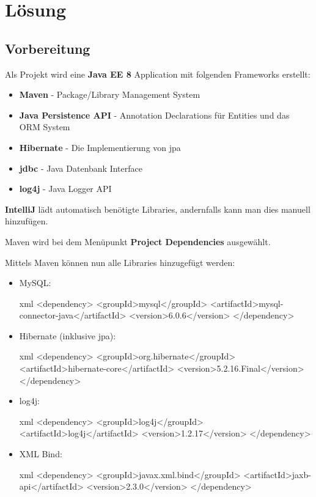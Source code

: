 
\section{Lösung}

\subsection{Vorbereitung}

Als Projekt wird eine \textbf{Java EE 8} Application mit folgenden Frameworks erstellt:
\begin{itemize}
    \item \textbf{Maven} - Package/Library Management System
    \item \textbf{Java Persistence API} - Annotation Declarations für Entities und das ORM System
    \item \textbf{Hibernate} - Die Implementierung von \gls{jpa}
    \item \textbf{\gls{jdbc}} - Java Datenbank Interface
    \item \textbf{log4j} - Java Logger API
\end{itemize}
\textbf{IntelliJ} lädt automatisch benötigte Libraries, andernfalls kann man dies manuell hinzufügen.

Maven wird bei dem Menüpunkt \textbf{Project Dependencies} ausgewählt.

Mittels Maven können nun alle Libraries hinzugefügt werden:

\begin{itemize}
    \item MySQL:
        \begin{code}{xml}
        <dependency>
            <groupId>mysql</groupId>
            <artifactId>mysql-connector-java</artifactId>
            <version>6.0.6</version>
        </dependency>
        \end{code}
    \item Hibernate (inklusive \gls{jpa}):
        \begin{code}{xml}
        <dependency>
            <groupId>org.hibernate</groupId>
            <artifactId>hibernate-core</artifactId>
            <version>5.2.16.Final</version>
        </dependency>
        \end{code}
    \item log4j:
        \begin{code}{xml}
        <dependency>
            <groupId>log4j</groupId>
            <artifactId>log4j</artifactId>
            <version>1.2.17</version>
        </dependency>
        \end{code}
    \item XML Bind:
        \begin{code}{xml}
        <dependency>
            <groupId>javax.xml.bind</groupId>
            <artifactId>jaxb-api</artifactId>
            <version>2.3.0</version>
        </dependency>
        \end{code}
\end{itemize}

